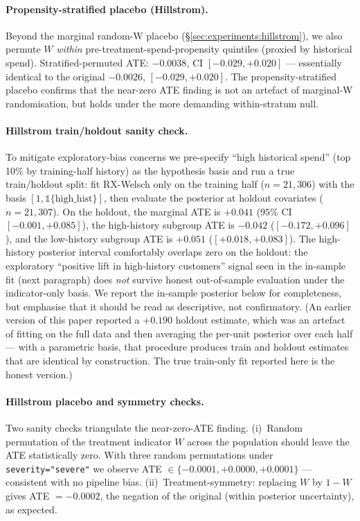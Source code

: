\paragraph{Propensity-stratified placebo (Hillstrom).}
Beyond the marginal random-W placebo (\S\ref{sec:experiments:hillstrom}),
we also permute $W$ \emph{within} pre-treatment-spend-propensity
quintiles (proxied by historical spend). Stratified-permuted ATE:
$-0.0038$, CI $[-0.029, +0.020]$ --- essentially identical to the
original $-0.0026$, $[-0.029, +0.020]$. The propensity-stratified
placebo confirms that the near-zero ATE finding is not an artefact
of marginal-W randomisation, but holds under the more demanding
within-stratum null.

\paragraph{Hillstrom train/holdout sanity check.}
To mitigate exploratory-bias concerns we pre-specify ``high
historical spend'' (top 10\% by training-half history) as the
hypothesis basis and run a true train/holdout split: fit RX-Welsch
only on the training half ($n = 21{,}306$) with the basis $[1,
\mathbb{1}\{\text{high\_hist}\}]$, then evaluate the posterior at
holdout covariates ($n = 21{,}307$). On the holdout, the marginal
ATE is $+0.041$ ($95\%$ CI $[-0.001, +0.085]$), the high-history
subgroup ATE is $-0.042$ ($[-0.172, +0.096]$), and the low-history
subgroup ATE is $+0.051$ ($[+0.018, +0.083]$). The high-history
posterior interval comfortably overlaps zero on the holdout: the
exploratory ``positive lift in high-history customers'' signal
seen in the in-sample fit (next paragraph) does \emph{not} survive
honest out-of-sample evaluation under the indicator-only basis.
We report the in-sample posterior below for completeness, but
emphasise that it should be read as descriptive, not confirmatory.
(An earlier version of this paper reported a $+0.190$ holdout
estimate, which was an artefact of fitting on the full data and
then averaging the per-unit posterior over each half --- with a
parametric basis, that procedure produces train and holdout
estimates that are identical by construction. The
true train-only fit reported here is the honest version.)

\paragraph{Hillstrom placebo and symmetry checks.}
Two sanity checks triangulate the near-zero-ATE finding. (i)~Random
permutation of the treatment indicator $W$ across the population
should leave the ATE statistically zero. With three random
permutations under \texttt{severity="severe"} we observe ATE
$\in \{-0.0001, +0.0000, +0.0001\}$ --- consistent with no
pipeline bias. (ii)~Treatment-symmetry: replacing $W$ by $1 - W$
gives ATE $= -0.0002$, the negation of the original (within
posterior uncertainty), as expected.

